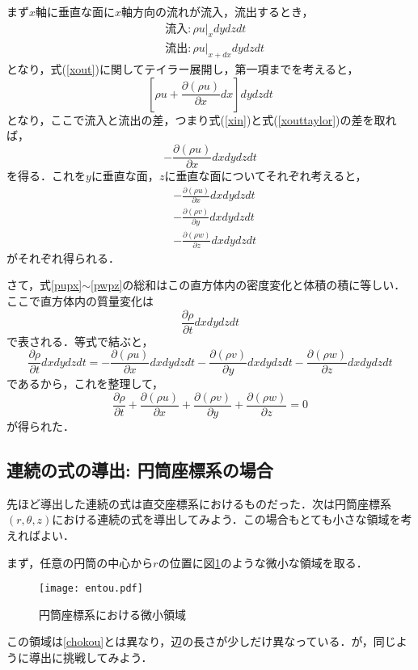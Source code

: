 \documentclass{jsarticle}
\newcommand{\pfrac}[2]{\frac{\partial{}{#1}}{\partial{}{#2}}}
\begin{document}
まず$x$軸に垂直な面に$x$軸方向の流れが流入，流出するとき，
\begin{align}
  &流入:\rho{}u|_{x}dydzdt\label{xin}\\
  &流出:\rho{}u|_{x+dx}dydzdt\label{xout}
\end{align}
となり，式(\ref{xout})に関してテイラー展開し，第一項までを考えると，
\begin{equation}
  \left[\rho{}u+\pfrac{(\rho{}u)}{x}dx\right]dydzdt\label{xouttaylor}
\end{equation}
となり，ここで流入と流出の差，つまり式(\ref{xin})と式(\ref{xouttaylor})の差を取れば，
\begin{equation}
  -\pfrac{(\rho{}u)}{x}dxdydzdt
\end{equation}
を得る．これを$y$に垂直な面，$z$に垂直な面についてそれぞれ考えると，
\begin{align}
  &-\pfrac{(\rho{}u)}{x}dxdydzdt\label{pupx}\\
  &-\pfrac{(\rho{}v)}{y}dxdydzdt\label{pvpy}\\
  &-\pfrac{(\rho{}w)}{z}dxdydzdt\label{pwpz}
\end{align}
がそれぞれ得られる．

さて，式\ref{pupx}$\sim$\ref{pwpz}の総和はこの直方体内の密度変化と体積の積に等しい．ここで直方体内の質量変化は
\begin{equation}
  \pfrac{\rho}{t}dxdydzdt
\end{equation}
で表される．等式で結ぶと，
\begin{equation}
  \pfrac{\rho}{t}dxdydzdt=-\pfrac{(\rho{}u)}{x}dxdydzdt-\pfrac{(\rho{}v)}{y}dxdydzdt-\pfrac{(\rho{}w)}{z}dxdydzdt
\end{equation}
であるから，これを整理して，
\begin{equation}
  \pfrac{\rho}{t}+\pfrac{(\rho{}u)}{x}+\pfrac{(\rho{}v)}{y}+\pfrac{(\rho{}w)}{z}=0
\end{equation}
が得られた．

\subsection{連続の式の導出: 円筒座標系の場合}
先ほど導出した連続の式は直交座標系におけるものだった．次は円筒座標系$(r, \theta, z)$における連続の式を導出してみよう．この場合もとても小さな領域を考えればよい．

まず，任意の円筒の中心から$r$の位置に図\ref{entou}のような微小な領域を取る．
\begin{figure}[H]
  \centering
  \texttt{[image: entou.pdf]}
  \caption{円筒座標系における微小領域}
  \label{entou}
\end{figure}
この領域は\ref{chokou}とは異なり，辺の長さが少しだけ異なっている．が，同じように導出に挑戦してみよう．
\end{document}
